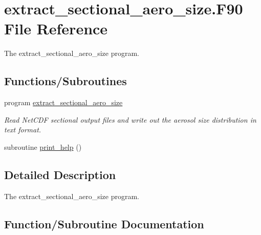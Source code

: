 \hypertarget{extract__sectional__aero__size_8_f90}{}\section{extract\+\_\+sectional\+\_\+aero\+\_\+size.\+F90 File Reference}
\label{extract__sectional__aero__size_8_f90}


The extract\+\_\+sectional\+\_\+aero\+\_\+size program.  


\subsection*{Functions/\+Subroutines}
\begin{DoxyCompactItemize}
\item 
program \mbox{\hyperlink{extract__sectional__aero__size_8_f90_af566de548900042b2dbfa5dde2c2aa99}{extract\+\_\+sectional\+\_\+aero\+\_\+size}}
\begin{DoxyCompactList}\small\item\em Read Net\+C\+DF sectional output files and write out the aerosol size distribution in text format. \end{DoxyCompactList}\item 
subroutine \mbox{\hyperlink{extract__sectional__aero__size_8_f90_afec0dfe781572b1d5e8bb53a27d5ae70}{print\+\_\+help}} ()
\end{DoxyCompactItemize}


\subsection{Detailed Description}
The extract\+\_\+sectional\+\_\+aero\+\_\+size program. 



\subsection{Function/\+Subroutine Documentation}
\mbox{\label{extract__sectional__aero__size_8_f90_af566de548900042b2dbfa5dde2c2aa99}} 
